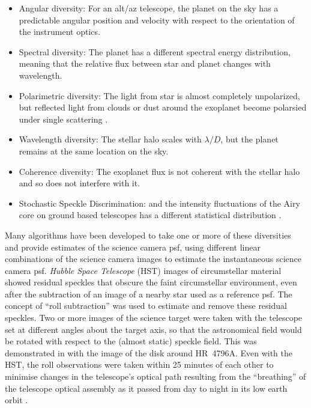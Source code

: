 \documentclass[letterpaper]{ar-1col}
\newcommand{\ld}{$\lambda/D$}
\begin{document}
\begin{itemize}
    \item Angular diversity: For an alt/az telescope, the planet on the sky has a predictable angular position and velocity with respect to the orientation of the instrument optics.
    \item Spectral diversity: The planet has a different spectral energy distribution, meaning that the relative flux between star and planet changes with wavelength.
    \item Polarimetric diversity: The light from star is almost completely unpolarized, but reflected light from clouds or dust around the exoplanet become polarsied under single scattering \citep{Gledhill91}.
    \item Wavelength diversity: The stellar halo scales with \ld{}, but the planet remains at the same location on the sky.
    \item Coherence diversity: The exoplanet flux is not coherent with the stellar halo and so does not interfere with it.
    \item Stochastic Speckle Discrimination: and the intensity fluctuations of the Airy core on ground based telescopes has a different statistical distribution \citep{Gladysz09}.
\end{itemize}

Many algorithms have been developed to take one or more of these diversities and provide estimates of the science camera \ac{psf}, using different linear combinations of the science camera images to estimate the instantaneous science camera \ac{psf}.
%
{\it Hubble Space Telescope} (HST) images of circumstellar material showed residual speckles that obscure the faint circumstellar environment, even after the subtraction of an image of a nearby star used as a reference \ac{psf}.
%
The concept of ``roll subtraction''  \citep{Schneider98} was used to estimate and remove these residual speckles.
%
Two or more images of the science target were taken with the telescope set at different angles about the target axis, so that the astronomical field would be rotated with respect to the (almost static) speckle field.
%
This was demonstrated in \citet{Schneider99} with the image of the disk around HR~4796A.
%
Even with the HST, the roll observations were taken within 25 minutes of each other to minimise changes in the telescope's optical path resulting from the ``breathing'' of the telescope optical assembly as it passed from day to night in its low earth orbit \citep{Bely93}.
\end{document}

